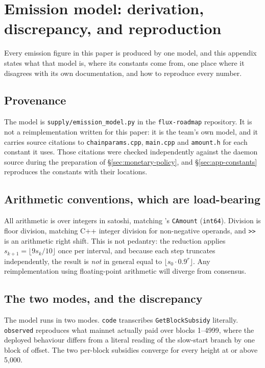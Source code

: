 \section{Emission model: derivation, discrepancy, and reproduction}
\label{sec:app-emission}

Every emission figure in this paper is produced by one model, and this appendix states what that
model is, where its constants come from, one place where it disagrees with its own documentation,
and how to reproduce every number.

\subsection{Provenance}

The model is \texttt{supply/\allowbreak{}emission\_model.\allowbreak{}py} in the \texttt{flux-roadmap} repository. It is not a
reimplementation written for this paper: it is the team's own model, and it carries source citations
to \texttt{chainparams.\allowbreak{}cpp}, \texttt{main.cpp} and \texttt{amount.h} for each constant it uses. Those
citations were checked independently against the daemon source during the preparation of
\S\ref{sec:monetary-policy}, and \S\ref{sec:app-constants} reproduces the constants with their
locations.

\subsection{Arithmetic conventions, which are load-bearing}

All arithmetic is over integers in satoshi, matching \fluxd's \texttt{CAmount} (\texttt{int64}).
Division is floor division, matching C++ integer division for non-negative operands, and \texttt{>>}
is an arithmetic right shift. This is not pedantry: the \PoN reduction applies
$s_{k+1} = \lfloor 9 s_k / 10 \rfloor$ once per interval, and because each step truncates
independently, the result is \emph{not} in general equal to $\lfloor s_0 \cdot 0.9^{r} \rfloor$. Any
reimplementation using floating-point arithmetic will diverge from consensus.

\subsection{The two modes, and the discrepancy}

The model runs in two modes. \texttt{code} transcribes \texttt{Get\allowbreak{}Block\allowbreak{}Subsidy} literally.
\texttt{observed} reproduces what mainnet actually paid over blocks 1--4999, where the deployed
behaviour differs from a literal reading of the slow-start branch by one block of offset. The two
per-block subsidies converge for every height at or above 5{,}000.

